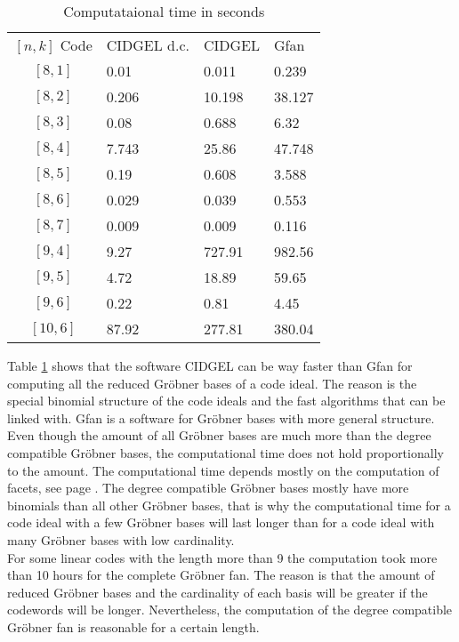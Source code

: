  \begin{table}[htpb] 
 \centering 
 \caption{Computataional time in seconds}
 \begin{tabular}{c|l|l|l} %
   $[n,k]$ Code & CIDGEL d.c. & CIDGEL & Gfan \\
 \cline{1-4} $[8,1]$  & 0.01  & 0.011  & 0.239 \\
 			 $[8,2]$  & 0.206 & 10.198 & 38.127 \\
  			 $[8,3]$  & 0.08  & 0.688  & 6.32 \\
  			 $[8,4]$  & 7.743 & 25.86  & 47.748 \\
 			 $[8,5]$  & 0.19  & 0.608  & 3.588  \\
 			 $[8,6]$  & 0.029 & 0.039  & 0.553\\
  			 $[8,7]$  & 0.009 & 0.009  & 0.116 \\
  			 $[9,4]$  & 9.27  & 727.91 & 982.56 \\
  			 $[9,5]$  & 4.72  & 18.89  & 59.65 \\
  			 $[9,6]$  & 0.22  & 0.81   & 4.45 \\
  			 $[10,6]$ & 87.92 & 277.81 & 380.04 \\
 \end{tabular}
 \label{tab:benchmark}
 \end{table}  
 
 \newpage
 
 Table \ref{tab:benchmark} shows that the software CIDGEL can be way faster than Gfan for computing all the reduced Gröbner bases of a code ideal. The reason is the special binomial structure of the code ideals and the fast algorithms that can be linked with. Gfan is a software for Gröbner bases with more general structure.
 Even though the amount of all Gröbner bases are much more than the degree compatible Gröbner bases, the computational time does not hold proportionally to the amount.
 The computational time depends mostly on the computation of facets, see page \pageref{facets}. The degree compatible Gröbner bases mostly have more binomials than all other Gröbner bases, that is why the computational time for a code ideal with a few Gröbner bases will last longer than for a code ideal with many Gröbner bases with low cardinality. \\
 
 For some linear codes with the length more than 9 the computation took more than 10 hours for the complete Gröbner fan. The reason is that the amount of reduced Gröbner bases and the cardinality of each basis will be greater if the codewords will be longer. Nevertheless, the computation of the degree compatible Gröbner fan is reasonable for a certain length.\newpage
 
